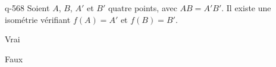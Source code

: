 \begin{truefalse}{q-568}
Soient $A$, $B$, $A'$ et $B'$  quatre points, avec $AB=A'B'$. Il existe une isométrie vérifiant $f(A)=A'$ et $f(B)=B'$.
\item* Vrai
\item Faux
\end{truefalse}

